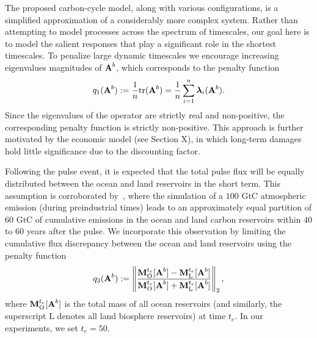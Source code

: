 \documentclass[11pt, a4paper, pdftex, twoside, dvipsnames]{article}
\newcommand{\bb}[1]{\boldsymbol{\bold{#1}}}
\newcommand{\tr}[1]{\text{tr}(#1)}
\begin{document}
 
The proposed carbon-cycle model, along with various configurations, is a simplified approximation of a considerably more complex system. 
Rather than attempting to model processes across the spectrum of timescales, our goal here is to model the salient responses that play a significant role in the shortest timescales. 
To penalize large dynamic timescales we encourage increasing eigenvalues magnitudes of $\bb{A}^b$, which corresponds to the penalty function
%
\begin{align}\label{eq:clim_model.7}
	q_1(\bb{A}^b) := \frac{1}{n} \tr{\bb{A}^b} = \frac{1}{n}\sum_{i=1}^n \bb{\lambda}_i(\bb{A}^b).
\end{align}
%
Since the eigenvalues of the operator are strictly real and non-positive, the corresponding penalty function is strictly non-positive. 
This approach is further motivated by the economic model (see Section X), in which long-term damages hold little significance due to the discounting factor.

Following the pulse event, it is expected that the total pulse flux will be equally distributed between the ocean and land reservoirs in the short term. 
This assumption is corroborated by~\cite{joos2013carbon}, where the simulation of a $100$ GtC atmospheric emission (during preindustrial times) leads to an approximately equal partition of $60$ GtC of cumulative emissions in the ocean and land carbon reservoirs within $40$ to $60$ years after the pulse. 
We incorporate this observation by limiting the cumulative flux discrepancy between the ocean and land reservoirs using the penalty function
\begin{align}\label{eq:clim_model.8}
	q_3(\bb{A}^b) := \left \| \frac{\bb{M}_{\text{O}}^{t_e}[\bb{A}^b] - \bb{M}_{\text{L}}^{t_e}[\bb{A}^b] }{\bb{M}_{\text{O}}^{t_e}[\bb{A}^b] + \bb{M}_{\text{L}}^{t_e}[\bb{A}^b] }\right \|_2,
\end{align}
%
where $\bb{M}^{t_e}_{\text{O}}[\bb{A}^b]$ is the total mass of all ocean reservoirs (and similarly, the superscript $\text{L}$ denotes all land biosphere reservoirs) at time $t_e$. 
In our experiments, we set $t_e=50$.
\end{document}

